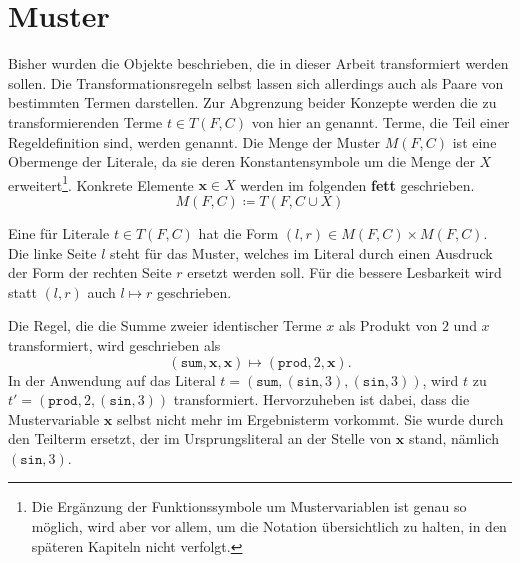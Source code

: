 \section{Muster} \label{subsecMuster}

Bisher wurden die Objekte beschrieben, die in dieser Arbeit transformiert werden sollen. Die Transformationsregeln selbst lassen sich allerdings auch als Paare von bestimmten Termen darstellen. Zur Abgrenzung beider Konzepte werden die zu transformierenden Terme $t\in T(F, C)$ von hier an  genannt. Terme, die  Teil einer Regeldefinition sind, werden  genannt. Die Menge der Muster $M(F, C)$ ist eine Obermenge der Literale, da sie deren Konstantensymbole um die Menge der  $X$ erweitert\footnote{Die Ergänzung der Funktionssymbole um Mustervariablen ist genau so möglich, wird aber vor allem, um die Notation übersichtlich zu halten, in den späteren Kapiteln nicht verfolgt.}. Konkrete Elemente $\mathbf x \in X$ werden im folgenden \textbf{fett} geschrieben.
$$M(F, C) \coloneqq T(F, C \cup X)$$

Eine  für Literale $t \in T(F, C)$ hat die Form $(l, r) \in M(F, C) \times M(F, C)$. Die linke Seite $l$ steht für das Muster, welches im Literal durch einen Ausdruck der Form der rechten Seite $r$ ersetzt werden soll. Für die bessere Lesbarkeit wird statt $(l, r)$ auch $l \mapsto r$ geschrieben.

\begin{beispiel} \label{bMuster}
Die Regel, die die Summe zweier identischer Terme $x$ als Produkt von $2$ und $x$ transformiert, wird geschrieben als
$$(\texttt{sum}, \mathbf x, \mathbf x) \mapsto (\texttt{prod}, 2, \mathbf x).$$
In der Anwendung auf das Literal 
$t = (\texttt{sum}, (\texttt{sin}, 3), (\texttt{sin}, 3))$, wird $t$ zu $t' = (\texttt{prod}, 2, (\texttt{sin}, 3))$ transformiert. 
Hervorzuheben ist dabei, dass die Mustervariable $\mathbf x$ selbst nicht mehr im Ergebnisterm vorkommt. Sie wurde durch den Teilterm ersetzt, der im Ursprungsliteral an der Stelle von $\mathbf x$ stand, nämlich $(\texttt{sin}, 3)$.
\end{beispiel}

